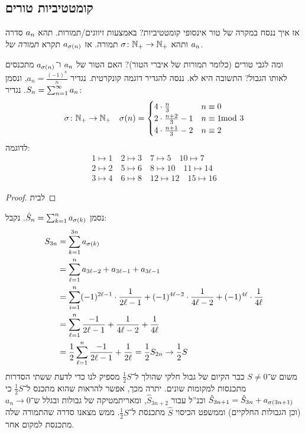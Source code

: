 \documentclass[name=רשימות חשבון דיפרנציאלי ואינטגרלי 1א]{../../../tex/classes/megasumPreamble}
\begin{document}
	\subsection{קומטטיביות טורים}
	אז איך ננסח במקרה של טור אינסופי קומטטיביות? באמצעות זיווגים/תמורות. תהא $a_n$ סדרה ותהא $\sigma \colon \mathbb{N}_+ \to \mathbb{N}_+$ תמורה. אז $a_{\sigma(n)}$ תקרא \textit{תמורה של $a_n$}.


	ומה לגבי טורים (כלומר תמורות של איברי הטור)? האם הטור של $a_n$ ו־$a_{\sigma(n)}$ מתכנסים לאותו הגבול? התשובה היא לא. ננסה להגדיר דוגמה קונקרטית. נגדיר $a_n = \frac{(-1)^{n}}{n}$, ונסמן $S_n = \sum_{n = 1}^{\infty} a_n$. נגדיר:
	\[ \sigma \colon \mathbb{N}_+ \to \mathbb{N}_+ \quad \sigma(n) = \begin{cases}
		4 \cdot \frac{n}{3} &  n \equiv 0 \\
		2 \cdot \frac{n + 2}{3} - 1 & n \equiv 1 \\
		4 \cdot \frac{n + 1}{3} - 2 & n \equiv 2
	\end{cases}\!\!\!\!\!\! \mod 3 \]
	לדוגמה:
	\begin{gather*}
		1 \mapsto 1 \quad 2 \mapsto 3 \quad 7 \mapsto 5 \quad 10 \mapsto 7 \\
		2 \mapsto 2 \quad 5 \mapsto 6 \quad 8 \mapsto 10 \quad 11 \mapsto 14 \\
		3 \mapsto 4 \quad 6 \mapsto 8 \quad 12 \mapsto 12 \quad 15 \mapsto 16
	\end{gather*}
	\begin{proof}
		לבית
	\end{proof}
	נסמן $\hat S_n = \sum_{k = 1}^{n} a_{\sigma(k)}$. נקבל:
	\begin{align*}
		S_{3n} &= \sum_{k = 1}^{3n}a_{\sigma(k)} \\
		&= \sum_{\ell = 1}^{n}a_{3\ell - 2} + a_{3\ell - 1} + a_{3\ell - 1} \\
		&= \sum_{i = 1}^{n}(-1)^{2\ell - 1} \cdot \frac{1}{2\ell - 1} + (-1)^{4\ell - 2} \cdot \frac{1}{4\ell - 2} + (-1)^{4\ell} \cdot \frac{1}{4\ell} \\
		&= \sum_{\ell = 1}^{n} \frac{-1}{2\ell - 1} + \frac{1}{4\ell - 2} + \frac{1}{4\ell} \\
		&= \frac{1}{2}\sum_{\ell =1}^{n}\frac{-1}{2\ell - 1} + \frac{1}{2\ell} = \frac{1}{2}S_{2n} \to \frac{1}{2}S
	\end{align*}
	משום ש־$S \neq 0$ כבר הקיום של גבול חלקי שהולך ל־$\frac{1}{2}S$ מספיק לנו כדי לדעת ששתי הסדרות מתכנסות למקומות שונים. יתרה מכך, אפשר להראות שהוא מתכנס ל־$\frac{1}{2}S$ כי $\hat S_{3n + 1} = \hat S_{3n} + a_{\sigma(3n + 1)}$ וכנ''ל עבור $\hat S_{3n + 2}$, ומאריתמטיקה של גבולות ובגלל ש־$a_n \to 0$ (וכן הגבולות החלקיים) וממשפט הכיסוי $\hat S$ מתכנסת ל־$\frac{1}{2}S$. ממש מצאנו סדרה שהתמורה שלה מתכנסת למקום אחר.
\end{document}
